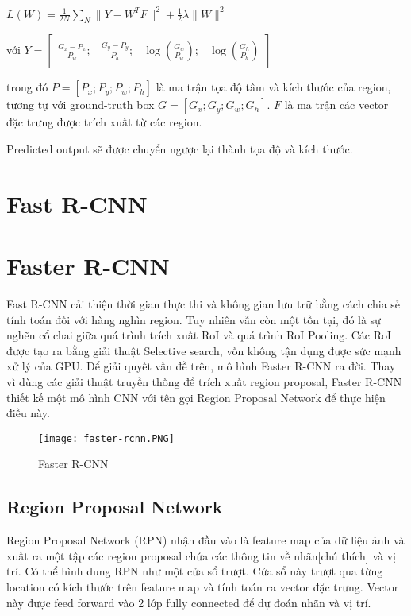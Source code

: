 \documentclass[../thesis.tex]{subfiles}
\begin{document}
$L(W) = \displaystyle\frac{1}{2N}\displaystyle\sum_{N}^{}\|Y - W^TF\|^2 + \frac{1}{2}\lambda\|W\|^2$

với $Y = 
\begin{bmatrix}
	\displaystyle\frac{G_x - P_x}{P_w}; & \displaystyle\frac{G_y - P_y}{P_h}; & \log\left(\displaystyle\frac{G_w}{P_w}\right); & \log\left(\displaystyle\frac{G_h}{P_h}\right)
\end{bmatrix}
$

trong đó $P = \left[P_x; P_y; P_w; P_h\right]$ là ma trận tọa độ tâm và kích thước của region, tương tự với ground-truth box $G = \left[G_x; G_y; G_w; G_h\right]$. $F$ là ma trận các vector đặc trưng được trích xuất từ các region. 

Predicted output sẽ được chuyển ngược lại thành tọa độ và kích thước. 

\section{Fast R-CNN}


\section{Faster R-CNN}

Fast R-CNN cải thiện thời gian thực thi và không gian lưu trữ bằng cách chia sẻ tính toán đối với hàng nghìn region. Tuy nhiên vẫn còn một tồn tại, đó là sự nghẽn cổ chai giữa quá trình trích xuất RoI và quá trình RoI Pooling. Các RoI được tạo ra bằng giải thuật Selective search, vốn không tận dụng được sức mạnh xử lý của GPU. Để giải quyết vấn đề trên, mô hình Faster R-CNN ra đời. Thay vì dùng các giải thuật truyền thống để trích xuất region proposal, Faster R-CNN thiết kế một mô hình CNN với tên gọi Region Proposal Network để thực hiện điều này.

\begin{figure}[!htb]
	\centering
	\texttt{[image: faster-rcnn.PNG]}
	\caption{Faster R-CNN}\label{Fig:faster_rcnn}
\end{figure}

\subsection{Region Proposal Network}

Region Proposal Network (RPN) nhận đầu vào là feature map của dữ liệu ảnh và xuất ra một tập các region proposal chứa các thông tin về nhãn[chú thích] và vị trí. Có thể hình dung RPN như một cửa sổ trượt. Cửa sổ này trượt qua từng location có kích thước  trên feature map và tính toán ra vector đặc trưng. Vector này được feed forward vào 2 lớp fully connected để dự đoán nhãn và vị trí.
\end{document}

